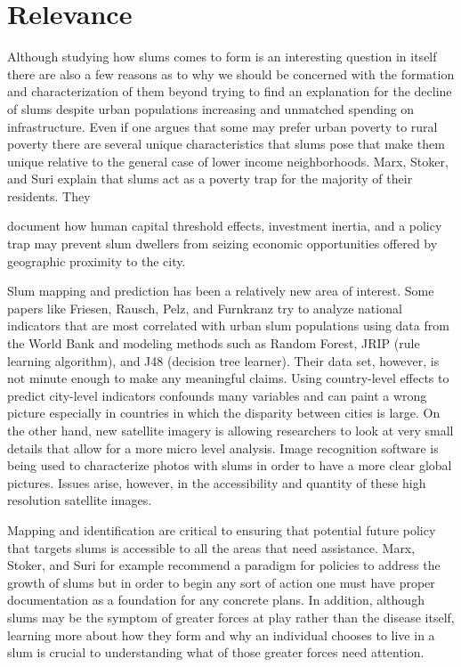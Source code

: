 \section{Relevance}

Although studying how slums comes to form is an interesting question in itself there are also a few reasons as to why we should be concerned with the formation and characterization of them beyond trying to find an explanation for the decline of slums despite urban populations increasing and unmatched spending on infrastructure. Even if one argues that some may prefer urban poverty to rural poverty there are several unique characteristics that slums pose that make them unique relative to the general case of lower income neighborhoods. Marx, Stoker, and Suri\textsuperscript{\cite{Marx}} explain that slums act as a poverty trap for the majority of their residents. They \begin{quoting}document how human capital threshold effects, investment inertia, and a policy trap may prevent slum dwellers from seizing economic opportunities offered by geographic proximity to the city.\end{quoting}

Slum mapping and prediction has been a relatively new area of interest. Some papers like Friesen, Rausch, Pelz, and Furnkranz\textsuperscript{\cite{wdislums}} try to analyze national indicators that are most correlated with urban slum populations using data from the World Bank and modeling methods such as Random Forest, JRIP (rule learning algorithm), and J48 (decision tree learner). Their data set, however, is not minute enough to make any meaningful claims. Using country-level effects to predict city-level indicators confounds many variables and can paint a wrong picture especially in countries in which the disparity between cities is large. On the other hand, new satellite imagery is allowing researchers to look at very small details that allow for a more micro level analysis. Image recognition software is being used to characterize photos with slums in order to have a more clear global pictures. Issues arise, however, in the accessibility and quantity of these high resolution satellite images.

Mapping and identification are critical to ensuring that potential future policy that targets slums is accessible to all the areas that need assistance. Marx, Stoker, and Suri\textsuperscript{\cite{Marx}} for example recommend a paradigm for policies to address the growth of slums but in order to begin any sort of action one must have proper documentation as a foundation for any concrete plans. In addition, although slums may be the symptom of greater forces at play rather than the disease itself, learning more about how they form and why an individual chooses to live in a slum is crucial to understanding what of those greater forces need attention.

